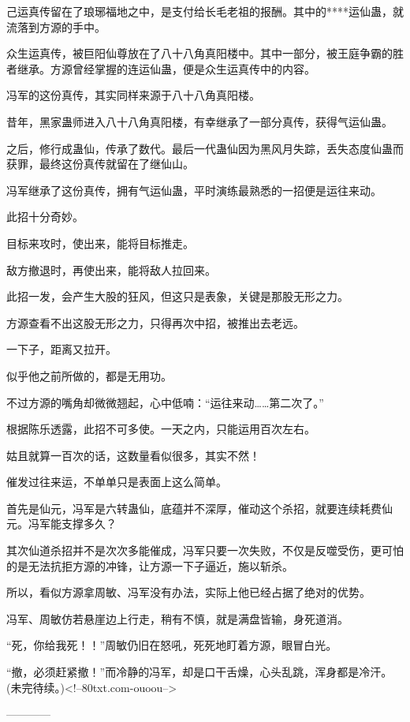 \begin{this_body}
己运真传留在了琅琊福地之中，是支付给长毛老祖的报酬。其中的****运仙蛊，就流落到方源的手中。

众生运真传，被巨阳仙尊放在了八十八角真阳楼中。其中一部分，被王庭争霸的胜者继承。方源曾经掌握的连运仙蛊，便是众生运真传中的内容。

冯军的这份真传，其实同样来源于八十八角真阳楼。

昔年，黑家蛊师进入八十八角真阳楼，有幸继承了一部分真传，获得气运仙蛊。

之后，修行成蛊仙，传承了数代。最后一代蛊仙因为黑风月失踪，丢失态度仙蛊而获罪，最终这份真传就留在了继仙山。

冯军继承了这份真传，拥有气运仙蛊，平时演练最熟悉的一招便是运往来动。

此招十分奇妙。

目标来攻时，使出来，能将目标推走。

敌方撤退时，再使出来，能将敌人拉回来。

此招一发，会产生大股的狂风，但这只是表象，关键是那股无形之力。

方源查看不出这股无形之力，只得再次中招，被推出去老远。

一下子，距离又拉开。

似乎他之前所做的，都是无用功。

不过方源的嘴角却微微翘起，心中低喃：“运往来动……第二次了。”

根据陈乐透露，此招不可多使。一天之内，只能运用百次左右。

姑且就算一百次的话，这数量看似很多，其实不然！

催发过往来运，不单单只是表面上这么简单。

首先是仙元，冯军是六转蛊仙，底蕴并不深厚，催动这个杀招，就要连续耗费仙元。冯军能支撑多久？

其次仙道杀招并不是次次多能催成，冯军只要一次失败，不仅是反噬受伤，更可怕的是无法抗拒方源的冲锋，让方源一下子逼近，施以斩杀。

所以，看似方源拿周敏、冯军没有办法，实际上他已经占据了绝对的优势。

冯军、周敏仿若悬崖边上行走，稍有不慎，就是满盘皆输，身死道消。

“死，你给我死！！”周敏仍旧在怒吼，死死地盯着方源，眼冒白光。

“撤，必须赶紧撤！”而冷静的冯军，却是口干舌燥，心头乱跳，浑身都是冷汗。(未完待续。)<!--80txt.com-ouoou-->

------------

\end{this_body}

